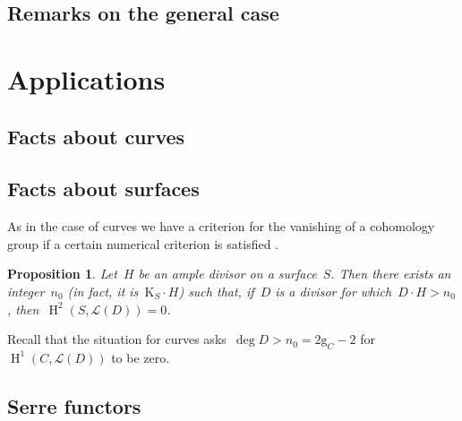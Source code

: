 \documentclass[10pt,a4paper]{article}
\theoremstyle{lecture}
\newtheorem{proposition}[theorem]{Proposition}
\DeclareMathOperator\HH{H}
\begin{document}
\subsection{Remarks on the general case}
\label{subsection:remarks}


\section{Applications}
\label{section:applications}

\subsection{Facts about curves}
\label{subsection:facts-curves}

\subsection{Facts about surfaces}
\label{subsection:facts-surfaces}
As in the case of curves we have a criterion for the vanishing of a cohomology group if a certain numerical criterion is satisfied \cite[lemma V.1.7]{hartshorne-algebraic-geometry}.
\begin{proposition}
  Let~$H$ be an ample divisor on a surface~$S$. Then there exists an integer~$n_0$ (in fact, it is~$\mathrm{K}_S\cdot H$) such that, if~$D$ is a divisor for which~$D\cdot H>n_0$, then~$\HH^2(S,\mathcal{L}(D))=0$.
\end{proposition}
Recall that the situation for curves asks~$\deg D>n_0=2\mathrm{g}_C-2$ for~$\HH^1(C,\mathcal{L}(D))$ to be zero.

\subsection{Serre functors}
\label{subsection:serre-functors}

\printbibliography
\end{document}
